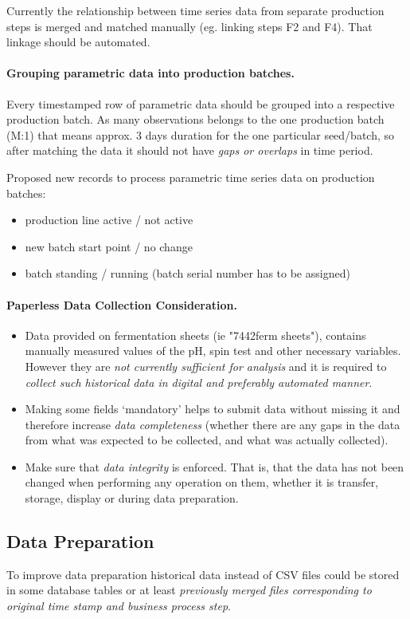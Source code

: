 Currently the relationship between time series data from separate production steps is merged and matched manually (eg. linking steps F2 and F4). That linkage should be automated.

\paragraph{Grouping parametric data into production batches.}
Every time\-stamped row of parametric data should be grouped into a respective production batch. As many observations belongs to the one production batch (M:1) that means approx. 3 days duration for the one particular seed/batch, so after matching the data it should not have \emph{gaps or overlaps} in time period.  

Proposed new records to process parametric time series data on production batches: 
\begin{itemize}
    \item production line active / not active
    \item new batch start point / no change
    \item batch standing / running (batch serial number has to be assigned) 
\end{itemize}

\paragraph{Paperless Data Collection Consideration.}
\begin{itemize}
    \item Data provided on fermentation sheets (ie "7442ferm sheets"), contains manually measured values of the pH, spin test and other necessary variables. However they are \emph{not currently sufficient for analysis} and it is required to \emph{collect such historical data in digital and preferably automated manner}. 
    \item Making some fields ‘mandatory’ helps to submit data without missing it and therefore increase \emph{data completeness} (whether there are any gaps in the data from what was expected to be collected, and what was actually collected).
    \item Make sure that \emph{data integrity} is enforced. That is, that the data has not been changed when performing any operation on them, whether it is transfer, storage, display or during data preparation.
\end{itemize}

\subsection{Data Preparation}
To improve data preparation historical data instead of CSV files could be stored in some database tables or at least \emph{previously merged files corresponding to original time stamp and business process step}.

